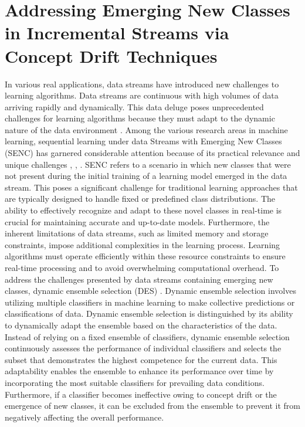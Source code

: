  
\chapter{Addressing Emerging New Classes in Incremental Streams via Concept Drift Techniques}
  \label{chapter:5_emerging}
  
  In various real applications, data streams have introduced new challenges to learning algorithms. Data streams are continuous with high volumes of data arriving rapidly and dynamically. This data deluge poses unprecedented challenges for learning algorithms because they must adapt to the dynamic nature of the data environment \cite{yang2021concept}\cite{dong2019multistream}\cite{shan2018online}. Among the various research areas in machine learning, sequential learning under data Streams with Emerging New Classes (SENC) has garnered considerable attention because of its practical relevance and unique challenges \cite{da2014learning}, \cite{mu2017streaming}, \cite{zhu2020semi}. SENC refers to a scenario in which new classes that were not present during the initial training of a learning model emerged in the data stream. This poses a significant challenge for traditional learning approaches that are typically designed to handle fixed or predefined class distributions. The ability to effectively recognize and adapt to these novel classes in real-time is crucial for maintaining accurate and up-to-date models. Furthermore, the inherent limitations of data streams, such as limited memory and storage constraints, impose additional complexities in the learning process. Learning algorithms must operate efficiently within these resource constraints to ensure real-time processing and to avoid overwhelming computational overhead.
To address the challenges presented by data streams containing emerging new classes, dynamic ensemble selection (DES) \cite{cruz2017meta}\cite{jackowski2014improved}\cite{kuncheva2000clustering}. Dynamic ensemble selection involves utilizing multiple classifiers in machine learning to make collective predictions or classifications of data. Dynamic ensemble selection is distinguished by its ability to dynamically adapt the ensemble based on the characteristics of the data. Instead of relying on a fixed ensemble of classifiers, dynamic ensemble selection continuously assesses the performance of individual classifiers and selects the subset that demonstrates the highest competence for the current data. This adaptability enables the ensemble to enhance its performance over time by incorporating the most suitable classifiers for prevailing data conditions. Furthermore, if a classifier becomes ineffective owing to concept drift or the emergence of new classes, it can be excluded from the ensemble to prevent it from negatively affecting the overall performance.
